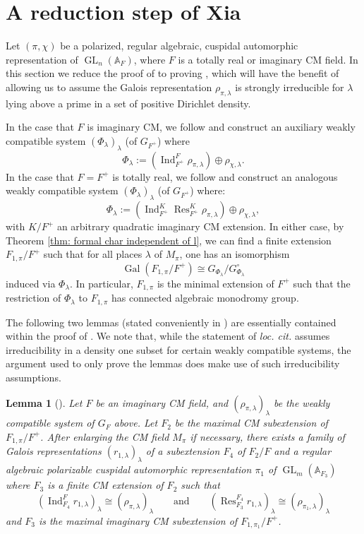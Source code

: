 \documentclass{amsart}
\newtheorem{lemma}[theorem]{Lemma}
\theoremstyle{definition}
\numberwithin{equation}{section} %
\newcommand{\GL}{\operatorname{GL}}
\newcommand{\Gal}{\operatorname{Gal}}
\newcommand{\Ind}{\operatorname{Ind}}
\newcommand{\Res}{\operatorname{Res}}
\newcommand{\bb}[1]{\mathbb{#1}}
\begin{document}
\section{A reduction step of Xia} \label{section: Xia reduction}

Let \( (\pi,\chi) \) be a polarized, regular algebraic, cuspidal automorphic representation of \( \GL_n(\bb{A}_F) \), where \( F \) is a totally real or imaginary CM field.
In this section we reduce the proof of  to proving , which will have the benefit of allowing us to assume the Galois representation $\rho_{\pi,\lambda}$ is strongly irreducible for $\lambda$ lying above a prime in a set of positive Dirichlet density. 

In the case that $F$ is imaginary CM, we follow \cite[\S4]{Xia19} and construct an auxiliary weakly compatible system \( (\Phi_\lambda)_\lambda \) (of \( G_{F^+} \)) where
\[ \Phi_\lambda := (\Ind_{F^+}^{F} \rho_{\pi,\lambda}) \oplus \rho_{\chi,\lambda}. \]
In the case that $F = F^+$ is totally real, we follow \cite[\S4.2.3]{Hui23} and construct an analogous weakly compatible system \( (\Phi_\lambda)_\lambda \) (of \( G_{F^+} \)) where:
\[ \Phi_\lambda := (\Ind_{F^+}^{K} \Res_{F^+}^{K} \rho_{\pi,\lambda}) \oplus \rho_{\chi,\lambda}, \]
with $K/F^+$ an arbitrary quadratic imaginary CM extension. 
In either case, by Theorem \ref{thm: formal char independent of l}, we can find a finite extension \( F_{1,\pi}/F^+ \) such that for all places \( \lambda \) of \( M_\pi \), one has an isomorphism
\[ \Gal(F_{1,\pi}/F^+)\cong G_{\Phi_\lambda}/G_{\Phi_\lambda}^\circ \]
induced via \( \Phi_\lambda \). In particular, \( F_{1,\pi} \) is the minimal extension of \( F^+ \) such that the restriction of \( \Phi_{\lambda} \) to \( F_{1,\pi} \) has connected algebraic monodromy group.

The following two lemmas (stated conveniently in \cite[\S 4]{Hui23}) are essentially contained within the proof of \cite[Proposition 2]{Xia19}. We note that, while the statement of \textit{loc. cit.} assumes irreducibility in a density one subset for certain weakly compatible systems, the argument used to only prove the lemmas does make use of such irreducibility assumptions.

\begin{lemma}[{\cite[Proposition 4.13]{Hui23}}]\label{lemma: work with pi_1 imaginary CM}
    Let \( F \) be an imaginary CM field, and \( (\rho_{\pi,\lambda})_{\lambda} \) be the weakly compatible system of \( G_F \) above.
    Let \( F_2 \) be the maximal CM subextension of \( F_{1,\pi}/F^+ \). After enlarging the CM field \( M_\pi \) if necessary, there exists a family of Galois representations \( (r_{1,\lambda})_\lambda \) of a subextension \( F_4 \) of \( F_2/F \) and a regular algebraic polarizable cuspidal automorphic representation \( \pi_1 \) of \( \GL_m(\bb{A}_{F_3}) \) where \( F_3 \) is a finite CM extension of \( F_2 \) such that
    \[ (\Ind_{F_4}^F r_{1,\lambda})_\lambda \cong (\rho_{\pi,\lambda})_\lambda \qquad\text{and}\qquad (\Res^{F_4}_{F_3} r_{1,\lambda})_\lambda \cong (\rho_{\pi_1,\lambda})_\lambda \]
    and \( F_3 \) is the maximal imaginary CM subextension of \( F_{1,\pi_1}/F^+ \).
\end{lemma}
\end{document}
